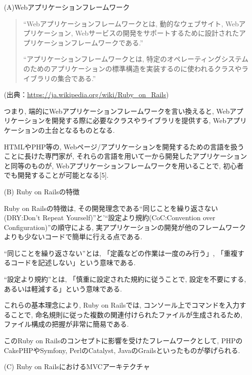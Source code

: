 \begin{description}
\item (A)Webアプリケーションフレームワーク

\begin{quotation}
\begin{screen}
“Webアプリケーションフレームワークとは, 動的なウェブサイト, Webアプリケーション, Webサービスの開発をサポートするために設計されたアプリケーションフレームワークである.”

“アプリケーションフレームワークとは, 特定のオペレーティングシステムのためのアプリケーションの標準構造を実装するのに使われるクラスやライブラリの集合である.”
\end{screen}
\end{quotation}
\begin{flushright}
(出典：\url{https://ja.wikipedia.org/wiki/Ruby_on_Rails})
\end{flushright}

つまり, 端的にWebアプリケーションフレームワークを言い換えると, Webアプリケーションを開発する際に必要なクラスやライブラリを提供する, Webアプリケーションの土台となるものとなる.

HTMLやPHP等の, Webページ/アプリケーションを開発するための言語を扱うことに長けた専門家が, それらの言語を用いて一から開発したアプリケーションと同等のものが, Webアプリケーションフレームワークを用いることで, 初心者でも開発することが可能となる[5].

\item (B) Ruby on Railsの特徴

Ruby on Railsの特徴は, その開発理念である“同じことを繰り返さない(DRY:Don't Repeat Yourself)”と'“設定より規約(CoC:Convention over Configuration)”の順守による, 実アプリケーションの開発が他のフレームワークよりも少ないコードで簡単に行える点である.

“同じことを繰り返さない”とは, 「定義などの作業は一度のみ行う」, 「重複するコードを記述しない」という意味である.

“設定より規約”とは, 「慎重に設定された規約に従うことで, 設定を不要にする, あるいは軽減する」という意味である.

これらの基本理念により, Ruby on Railsでは, コンソール上でコマンドを入力することで, 命名規則に従った複数の関連付けられたファイルが生成されるため, ファイル構成の把握が非常に簡易である.

このRuby on Railsのコンセプトに影響を受けたフレームワークとして, PHPのCakePHPやSymfony, PerlのCatalyst, JavaのGrailsといったものが挙げられる.

\item (C) Ruby on RailsにおけるMVCアーキテクチャ


\end{description}
